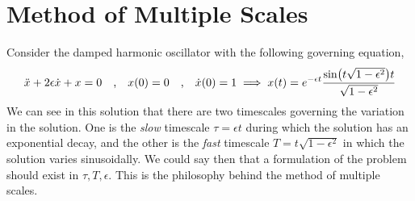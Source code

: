 \documentclass[a4paper,11pt]{article}
\begin{document}
\section{Method of Multiple Scales}
Consider the damped harmonic oscillator with the following governing equation,
\begin{equation*}
\ddot{x} + 2 \epsilon \dot{x} + x = 0 \qq{,}  x(0) = 0 \qq{,} \dot{x}(0) = 1 \implies x(t) = e^{-\epsilon t} \dfrac{\sin(t \sqrt{1-\epsilon^2})t}{\sqrt{1-\epsilon^2}}
\end{equation*}
We can see in this solution that there are two timescales governing the variation in the solution. One is the \textit{slow} timescale $ \tau = \epsilon t $ during which the solution has an exponential decay, and the other is the \textit{fast} timescale $ T = t \sqrt{1 - \epsilon^2} $ in which the solution varies sinusoidally. We could say then that a formulation of the problem should exist in $ \tau, T, \epsilon $. This is the philosophy behind the method of multiple scales.
\end{document}
